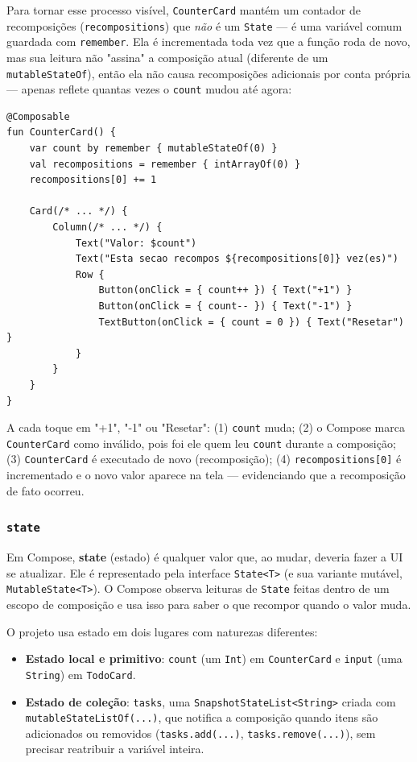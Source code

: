 \documentclass[11pt,a4paper]{article}
\begin{document}
Para tornar esse processo visível, \texttt{CounterCard} mantém um
contador de recomposições (\texttt{recompositions}) que \emph{não} é um
\texttt{State} — é uma variável comum guardada com \texttt{remember}. Ela
é incrementada toda vez que a função roda de novo, mas sua leitura não
"assina" a composição atual (diferente de um \texttt{mutableStateOf}),
então ela não causa recomposições adicionais por conta própria — apenas
reflete quantas vezes o \texttt{count} mudou até agora:

\begin{lstlisting}[caption={Tornando a recomposição visível na tela}, label=lst:recomposicao]
@Composable
fun CounterCard() {
    var count by remember { mutableStateOf(0) }
    val recompositions = remember { intArrayOf(0) }
    recompositions[0] += 1

    Card(/* ... */) {
        Column(/* ... */) {
            Text("Valor: $count")
            Text("Esta secao recompos ${recompositions[0]} vez(es)")
            Row {
                Button(onClick = { count++ }) { Text("+1") }
                Button(onClick = { count-- }) { Text("-1") }
                TextButton(onClick = { count = 0 }) { Text("Resetar") }
            }
        }
    }
}
\end{lstlisting}

A cada toque em "+1", "-1" ou "Resetar": (1) \texttt{count} muda; (2) o
Compose marca \texttt{CounterCard} como inválido, pois foi ele quem leu
\texttt{count} durante a composição; (3) \texttt{CounterCard} é executado
de novo (recomposição); (4) \texttt{recompositions[0]} é incrementado e o
novo valor aparece na tela — evidenciando que a recomposição de fato
ocorreu.

\subsubsection{\texttt{state}}
\label{sec:state}

Em Compose, \textbf{state} (estado) é qualquer valor que, ao mudar,
deveria fazer a UI se atualizar. Ele é representado pela interface
\texttt{State<T>} (e sua variante mutável, \texttt{MutableState<T>}). O
Compose observa leituras de \texttt{State} feitas dentro de um escopo de
composição e usa isso para saber o que recompor quando o valor muda.

O projeto usa estado em dois lugares com naturezas diferentes:

\begin{itemize}
    \item \textbf{Estado local e primitivo}: \texttt{count} (um
    \texttt{Int}) em \texttt{CounterCard} e \texttt{input} (uma
    \texttt{String}) em \texttt{TodoCard}.
    \item \textbf{Estado de coleção}: \texttt{tasks}, uma
    \texttt{SnapshotStateList<String>} criada com
    \texttt{mutableStateListOf(...)}, que notifica a composição quando
    itens são adicionados ou removidos (\texttt{tasks.add(...)},
    \texttt{tasks.remove(...)}), sem precisar reatribuir a variável
    inteira.
\end{itemize}
\end{document}
